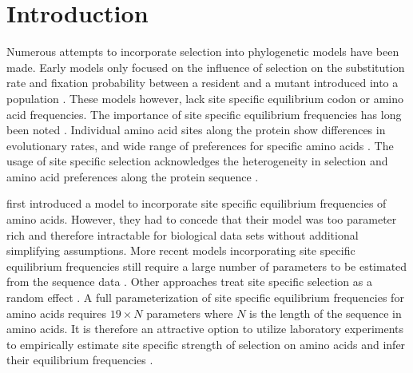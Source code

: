 \section{Introduction}

Numerous attempts to incorporate selection into phylogenetic models have been made.
Early models only focused on the influence of selection on the substitution rate and fixation probability between a resident and a mutant introduced into a population \citep{GoldmanAndYang1994, MuseAndGaut1994, thorne1996}.
These models however, lack site specific equilibrium codon or amino acid frequencies.
The importance of site specific equilibrium frequencies has long been noted \citep{felsenstein1981, gojobori1983}.
Individual amino acid sites along the protein show differences in evolutionary rates, and wide range of preferences for specific amino acids \citep{HalpernAndBruno1998, ashenberg2013, echave2016}.
The usage of site specific selection acknowledges the heterogeneity in selection and amino acid preferences along the protein sequence \citep{hilton2017}.

\citet{HalpernAndBruno1998} first introduced a model to incorporate site specific equilibrium frequencies of amino acids.
However, they had to concede that their model was too parameter rich and therefore intractable for biological data sets without additional simplifying assumptions.
More recent models incorporating site specific equilibrium frequencies still require a large number of parameters to be estimated from the sequence data \citep{LartillotAndPhilippe2004,le2008,wang2008,holder2008,wu2013,tamuri2014}.
Other approaches treat site specific selection as a random effect \citep{rodrigue2010,rodrigue2013,rodrigue2014}.
A full parameterization of site specific equilibrium frequencies for amino acids requires $19\times N$ parameters where $N$ is the length of the sequence in amino acids.
It is therefore an attractive option to utilize laboratory experiments to empirically estimate site specific strength of selection on amino acids and infer their equilibrium frequencies \citep{bloom2014, thyagarajan2014, bloom2017}.

